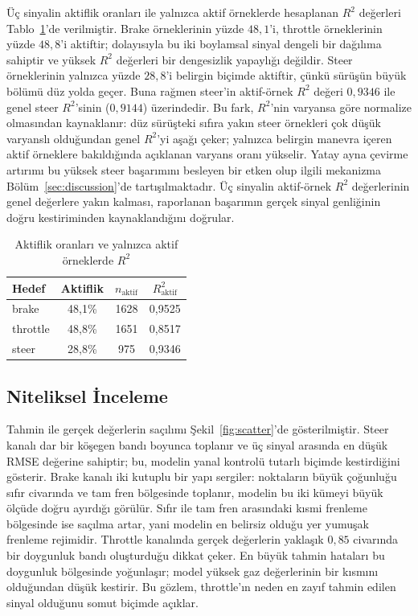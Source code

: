 \documentclass[conference]{IEEEtran}
\begin{document}
Üç sinyalin aktiflik oranları ile yalnızca aktif örneklerde hesaplanan $R^2$ değerleri Tablo~\ref{tab:active}'de verilmiştir. Brake örneklerinin yüzde $48{,}1$'i, throttle örneklerinin yüzde $48{,}8$'i aktiftir; dolayısıyla bu iki boylamsal sinyal dengeli bir dağılıma sahiptir ve yüksek $R^2$ değerleri bir dengesizlik yapaylığı değildir. Steer örneklerinin yalnızca yüzde $28{,}8$'i belirgin biçimde aktiftir, çünkü sürüşün büyük bölümü düz yolda geçer. Buna rağmen steer'in aktif-örnek $R^2$ değeri $0{,}9346$ ile genel steer $R^2$'sinin ($0{,}9144$) üzerindedir. Bu fark, $R^2$'nin varyansa göre normalize olmasından kaynaklanır: düz sürüşteki sıfıra yakın steer örnekleri çok düşük varyanslı olduğundan genel $R^2$'yi aşağı çeker; yalnızca belirgin manevra içeren aktif örneklere bakıldığında açıklanan varyans oranı yükselir. Yatay ayna çevirme artırımı bu yüksek steer başarımını besleyen bir etken olup ilgili mekanizma Bölüm~\ref{sec:discussion}'de tartışılmaktadır. Üç sinyalin aktif-örnek $R^2$ değerlerinin genel değerlere yakın kalması, raporlanan başarımın gerçek sinyal genliğinin doğru kestiriminden kaynaklandığını doğrular.

\begin{table}[t]
\caption{Aktiflik oranları ve yalnızca aktif örneklerde $R^2$}
\label{tab:active}
\centering
\footnotesize
\renewcommand{\arraystretch}{1.2}
\begin{tabular}{@{}lccc@{}}
\toprule
\textbf{Hedef} & \textbf{Aktiflik} & \textbf{$n_{\text{aktif}}$} & \textbf{$R^2_{\text{aktif}}$} \\
\midrule
brake    & 48,1\% & 1628 & 0,9525 \\
throttle & 48,8\% & 1651 & 0,8517 \\
steer    & 28,8\% & 975  & 0,9346 \\
\bottomrule
\end{tabular}
\end{table}

\subsection{Niteliksel İnceleme}

Tahmin ile gerçek değerlerin saçılımı Şekil~\ref{fig:scatter}'de gösterilmiştir. Steer kanalı dar bir köşegen bandı boyunca toplanır ve üç sinyal arasında en düşük RMSE değerine sahiptir; bu, modelin yanal kontrolü tutarlı biçimde kestirdiğini gösterir. Brake kanalı iki kutuplu bir yapı sergiler: noktaların büyük çoğunluğu sıfır civarında ve tam fren bölgesinde toplanır, modelin bu iki kümeyi büyük ölçüde doğru ayırdığı görülür. Sıfır ile tam fren arasındaki kısmi frenleme bölgesinde ise saçılma artar, yani modelin en belirsiz olduğu yer yumuşak frenleme rejimidir. Throttle kanalında gerçek değerlerin yaklaşık $0{,}85$ civarında bir doygunluk bandı oluşturduğu dikkat çeker. En büyük tahmin hataları bu doygunluk bölgesinde yoğunlaşır; model yüksek gaz değerlerinin bir kısmını olduğundan düşük kestirir. Bu gözlem, throttle'ın neden en zayıf tahmin edilen sinyal olduğunu somut biçimde açıklar.
\end{document}
